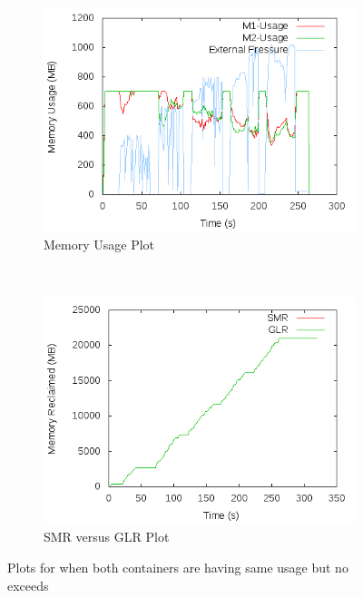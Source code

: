 	\begin{figure}[t!]
	    \centering
	    \begin{subfigure}[t]{0.48\textwidth}
	      \centering
	      \includegraphics[width=1\textwidth]{images/controller_issues/global_lru/mu.png}
	      \caption{Memory Usage Plot}
	      \label{img_no_sl_mu}
	    \end{subfigure}
	    ~ 
	    \begin{subfigure}[t]{0.48\textwidth}
	      \centering
	      \includegraphics[width=1\textwidth]{images/controller_issues/global_lru/compare.png}
	      \caption{SMR versus GLR Plot}
	      \label{img_no_sl_global_vs_local}
	    \end{subfigure}
	    \caption{Plots for when both containers are having same usage but no exceeds}
	  \end{figure}
	
